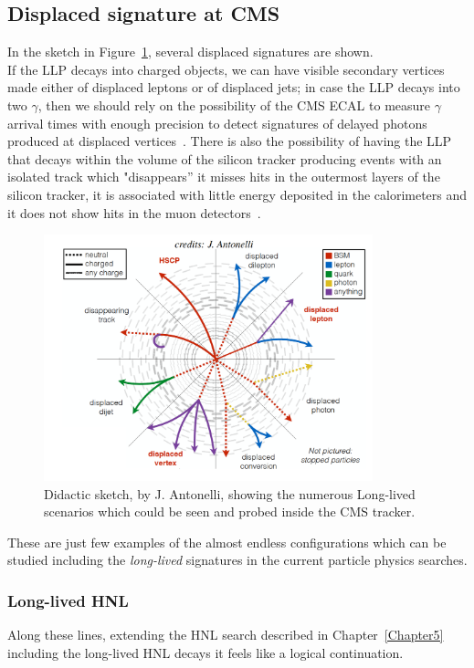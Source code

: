 \subsection{Displaced signature at CMS}
In the sketch in Figure~\ref{fig:c6antonelli}, several displaced
signatures are shown.\\
If the LLP decays into charged objects, we can have visible secondary vertices
made either of displaced leptons or of displaced jets; in case the LLP decays into two $\gamma$,
then we should rely on the possibility of the CMS
ECAL to measure $\gamma$ arrival times with enough precision to detect
signatures of delayed photons produced at displaced
vertices~\cite{Sirunyan:2019wau}.
There is also the possibility of having the LLP that decays within the
volume of the silicon tracker producing events with an isolated track
which "disappears'' \ie it misses hits in the outermost layers of the
silicon tracker, it is associated with little energy deposited in the
calorimeters and it does not show hits in the muon detectors~\cite{Sirunyan_2020disapp}. 
\begin{figure}[h]
\centering
\includegraphics[clip,trim=0cm 0.cm 0.cm 1.6cm, width=0.85\textwidth]{Figures/c6/antonelli_skech.pdf}
\caption{Didactic sketch, by J. Antonelli, showing the numerous
  Long-lived scenarios which could be seen and probed inside the CMS tracker. }
\label{fig:c6antonelli}
\end{figure}

These are just few examples of the almost endless configurations which can
be studied including the \emph{long-lived} signatures in the
current particle physics searches. 

\subsubsection{Long-lived HNL}
Along these lines, extending the HNL search described in
Chapter~\ref{Chapter5} including the long-lived HNL decays it feels like a logical
continuation. 

